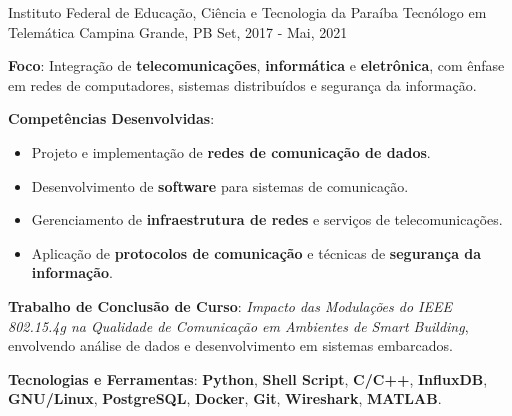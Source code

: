 
\begin{cventries}
  \cventry
  {Instituto Federal de Educação, Ciência e Tecnologia da Paraíba} %
  {Tecnólogo em Telemática} %
  {Campina Grande, PB} %
  {Set, 2017 - Mai, 2021} %
  {
    \begin{cvitems}
      \item {\textbf{Foco}: Integração de \textbf{telecomunicações}, \textbf{informática} e \textbf{eletrônica}, com ênfase em redes de computadores, sistemas distribuídos e segurança da informação.}
      \item {\textbf{Competências Desenvolvidas}:}
      \begin{itemize}
        \item {Projeto e implementação de \textbf{redes de comunicação de dados}.}
        \item {Desenvolvimento de \textbf{software} para sistemas de comunicação.}
        \item {Gerenciamento de \textbf{infraestrutura de redes} e serviços de telecomunicações.}
        \item {Aplicação de \textbf{protocolos de comunicação} e técnicas de \textbf{segurança da informação}.}
      \end{itemize}
      \item {\textbf{Trabalho de Conclusão de Curso}: \emph{Impacto das Modulações do IEEE 802.15.4g na Qualidade de Comunicação em Ambientes de Smart Building}, envolvendo análise de dados e desenvolvimento em sistemas embarcados.}
      \item {\textbf{Tecnologias e Ferramentas}: \textbf{Python}, \textbf{Shell Script}, \textbf{C/C++}, \textbf{InfluxDB}, \textbf{GNU/Linux}, \textbf{PostgreSQL}, \textbf{Docker}, \textbf{Git}, \textbf{Wireshark}, \textbf{MATLAB}.}
    \end{cvitems}
  }
\end{cventries}
